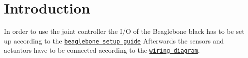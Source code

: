 \hypertarget{index_intro}{}\section{Introduction}\label{index_intro}
In order to use the joint controller the I/O of the Beaglebone black has to be set up according to the \href{https://github.com/TriPed-Robot/Wiki/wiki/Beaglebone-Setup}{\tt beaglebone setup guide} Afterwards the sensors and actuators have to be connected according to the \href{https://github.com/TriPed-Robot/Wiki/wiki/Wiring-diagram}{\tt wiring diagram}. 